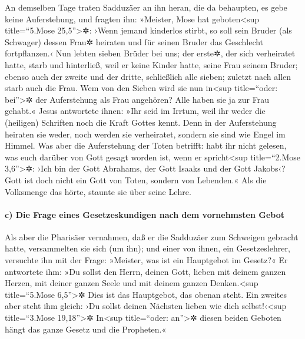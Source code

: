  An demselben Tage traten Sadduzäer an ihn heran, die da
behaupten, es gebe keine Auferstehung, und fragten ihn: 
»Meister, Mose hat geboten\textless sup title=``5.Mose
25,5''\textgreater✲: ›Wenn jemand kinderlos stirbt, so soll sein Bruder
(als Schwager) dessen Frau✲ heiraten und für seinen Bruder das
Geschlecht fortpflanzen.‹  Nun lebten sieben Brüder bei
uns; der erste✲, der sich verheiratet hatte, starb und hinterließ, weil
er keine Kinder hatte, seine Frau seinem Bruder;  ebenso
auch der zweite und der dritte, schließlich alle sieben; 
zuletzt nach allen starb auch die Frau.  Wem von den
Sieben wird sie nun in\textless sup title=``oder: bei''\textgreater✲ der
Auferstehung als Frau angehören? Alle haben sie ja zur Frau gehabt.«
 Jesus antwortete ihnen: »Ihr seid im Irrtum, weil ihr
weder die (heiligen) Schriften noch die Kraft Gottes kennt.
 Denn in der Auferstehung heiraten sie weder, noch werden
sie verheiratet, sondern sie sind wie Engel im Himmel. 
Was aber die Auferstehung der Toten betrifft: habt ihr nicht gelesen,
was euch darüber von Gott gesagt worden ist, wenn er
spricht\textless sup title=``2.Mose 3,6''\textgreater✲: 
›Ich bin der Gott Abrahams, der Gott Isaaks und der Gott Jakobs‹? Gott
ist doch nicht ein Gott von Toten, sondern von Lebenden.«
 Als die Volksmenge das hörte, staunte sie über seine
Lehre.

\hypertarget{c-die-frage-eines-gesetzeskundigen-nach-dem-vornehmsten-gebot}{%
\paragraph{c) Die Frage eines Gesetzeskundigen nach dem vornehmsten
Gebot}\label{c-die-frage-eines-gesetzeskundigen-nach-dem-vornehmsten-gebot}}

 Als aber die Pharisäer vernahmen, daß er die Sadduzäer
zum Schweigen gebracht hatte, versammelten sie sich (um ihn);
 und einer von ihnen, ein Gesetzeslehrer, versuchte ihn
mit der Frage:  »Meister, was ist ein Hauptgebot im
Gesetz?«  Er antwortete ihm: »Du sollst den Herrn, deinen
Gott, lieben mit deinem ganzen Herzen, mit deiner ganzen Seele und mit
deinem ganzen Denken.\textless sup title=``5.Mose 6,5''\textgreater✲
 Dies ist das Hauptgebot, das obenan steht.
 Ein zweites aber steht ihm gleich: ›Du sollst deinen
Nächsten lieben wie dich selbst!‹\textless sup title=``3.Mose
19,18''\textgreater✲  In\textless sup title=``oder:
an''\textgreater✲ diesen beiden Geboten hängt das ganze Gesetz und die
Propheten.«

